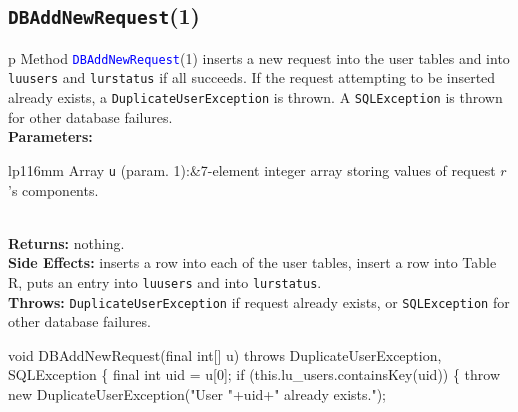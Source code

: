 \subsection{\texttt{DBAddNewRequest}(1)}
\begin{tabular}{p{\textwidth}}
\toprule
{}
Method \textcolor{blue}{{\tt{}\protect{}DBAddNewRequest}}(1) inserts a new request into the
user tables and into {\tt{}lu{}users} and {\tt{}lu{}rstatus} if all succeeds.  If the
request attempting to be inserted already exists, a {\tt{}DuplicateUserException}
is thrown. A {\tt{}SQLException} is thrown for other database failures.\\
\midrule
\textbf{Parameters:} \\
\begin{tabular}{lp{116mm}}
Array {\tt{}u} (param. 1):&7-element integer array storing values of
request $r$'s components.

\end{tabular}\\
\textbf{Returns:} nothing.\\
\textbf{Side Effects:} inserts a row into each of the user tables, insert a
row into Table R, puts an entry into {\tt{}lu{}users} and into {\tt{}lu{}rstatus}.\\
\textbf{Throws:} {\tt{}DuplicateUserException} if request already exists, or
{\tt{}SQLException} for other database failures.\\
\bottomrule
\end{tabular}
\nwenddocs{}\endmoddef{}
void DBAddNewRequest(final int[] u)
throws DuplicateUserException, SQLException \{
  final int uid = u[0];
  if (this.lu_users.containsKey(uid)) \{
    throw new DuplicateUserException("User "+uid+" already exists.");
